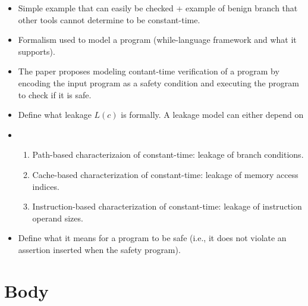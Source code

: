 \documentclass[11pt,a4paper]{article}
\begin{document}
\begin{itemize}
  \item Simple example that can easily be checked + example of benign branch that other tools cannot determine to be constant-time.
  \item Formalism used to model a program (while-language framework and what it supports).
  \item The paper proposes modeling contant-time verification of a program by encoding the input program as a safety condition and executing the program to check if it is safe.
  \item Define what leakage $L(c)$ is formally. A leakage model can either depend on
        \item \begin{enumerate}
          \item Path-based characterizaion of constant-time: leakage of branch conditions.
          \item Cache-based characterization of constant-time: leakage of memory access indices.
          \item Instruction-based characterization of constant-time: leakage of instruction operand sizes.
        \end{enumerate}
  \item Define what it means for a program to be safe (i.e., it does not violate an assertion inserted when the safety program).
\end{itemize}

\section{Body}

\end{document}
